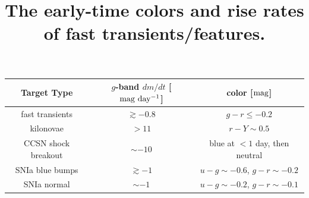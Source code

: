 \documentclass[11pt]{article}
\begin{document}
\begin{footnotesize}
\begin{center}
\title{The early-time colors and rise rates of fast transients/features.}\label{tab:1}
\begin{tabular}{|c|c|c|} 
\hline
Target Type         & $g$-band $dm/dt$ [$\rm mag\ day^{-1}$] & color [$\rm mag$] \\
\hline 
fast transients     & $\gtrsim-0.8$ & $g-r\leq-0.2$  \\ 
kilonovae           & $>11$          & $r-Y\sim0.5$  \\ 
CCSN shock breakout & $\sim-10$     & blue at $<1$ day, then neutral  \\ 
SNIa blue bumps     & $\gtrsim -1$  & $u-g\sim-0.6$, $g-r\sim-0.2$  \\ 
SNIa normal         & $\sim -1$     & $u-g\sim-0.2$, $g-r\sim-0.1$  \\
\hline
\end{tabular}
\end{center}
\end{footnotesize}
\end{document}
